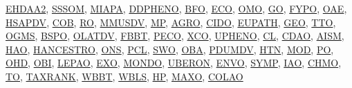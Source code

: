 \documentclass[10pt,a4paper,sans]{moderncv} %
\newcommand{\wikidata}[2]{\href{https://bioregistry.io/wikidata:#1?provider=scholia}{{#2}}}
\begin{document}
    \vspace{0.3cm}

        \wikidata{Q114667913}{EHDAA2},        \wikidata{Q108394480}{SSSOM},        \wikidata{Q81661690}{MIAPA},        \wikidata{Q81661585}{DDPHENO},        \wikidata{Q4866972}{BFO},        \wikidata{Q28445410}{ECO},        \wikidata{Q113012675}{OMO},        \wikidata{Q135085}{GO},        \wikidata{Q55118393}{FYPO},        \wikidata{Q81661725}{OAE},        \wikidata{Q81661653}{HSAPDV},        \wikidata{Q113006456}{COB},        \wikidata{Q28729320}{RO},        \wikidata{Q81661698}{MMUSDV},        \wikidata{Q81661707}{MP},        \wikidata{Q81661533}{AGRO},        \wikidata{Q110998476}{CIDO},        \wikidata{Q81661607}{EUPATH},        \wikidata{Q81661641}{GEO},        \wikidata{Q81661821}{TTO},        \wikidata{Q55118512}{OGMS},        \wikidata{Q81661546}{BSPO},        \wikidata{Q81661748}{OLATDV},        \wikidata{Q81661620}{FBBT},        \wikidata{Q81661777}{PECO},        \wikidata{Q81661839}{XCO},        \wikidata{Q81661827}{UPHENO},        \wikidata{Q55118285}{CL},        \wikidata{Q55118328}{CDAO},        \wikidata{Q112972813}{AISM},        \wikidata{Q81661648}{HAO},        \wikidata{Q81661647}{HANCESTRO},        \wikidata{Q113014431}{ONS},        \wikidata{Q113014435}{PCL},        \wikidata{Q113014439}{SWO},        \wikidata{Q81661730}{OBA},        \wikidata{Q81661775}{PDUMDV},        \wikidata{Q81661655}{HTN},        \wikidata{Q81661700}{MOD},        \wikidata{Q7201529}{PO},        \wikidata{Q55118561}{OHD},        \wikidata{Q7095051}{OBI},        \wikidata{Q113012667}{LEPAO},        \wikidata{Q113012658}{EXO},        \wikidata{Q27468140}{MONDO},        \wikidata{Q7876491}{UBERON},        \wikidata{Q31110555}{ENVO},        \wikidata{Q81661810}{SYMP},        \wikidata{Q55118415}{IAO},        \wikidata{Q55118301}{CHMO},        \wikidata{Q81661818}{TO},        \wikidata{Q81661813}{TAXRANK},        \wikidata{Q81661834}{WBBT},        \wikidata{Q81661837}{WBLS},        \wikidata{Q17027854}{HP},        \wikidata{Q113012668}{MAXO},        \wikidata{Q113009128}{COLAO}
\end{document}
